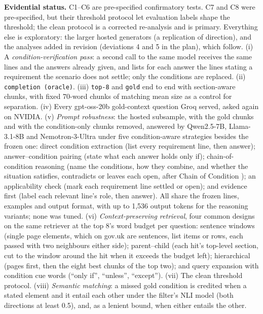 \textbf{Evidential status.} C1--C6 are pre-specified confirmatory tests. C7 and C8 were pre-specified, but their threshold protocol let evaluation labels shape the threshold; the clean protocol is a corrected re-analysis and is primary. Everything else is exploratory: the larger hosted generators (a replication of direction), and the analyses added in revision (deviations 4 and 5 in the plan), which follow. (i) A \emph{condition-verification pass}: a second call to the same model receives the same lines and the answers already given, and lists for each answer the lines stating a requirement the scenario does not settle; only the conditions are replaced. (ii) \texttt{completion (oracle)}. (iii) \texttt{top-8} and \texttt{gold} end to end with section-aware chunks, with fixed 70-word chunks of matching mean size as a control for separation. (iv) Every gpt-oss-20b gold-context question Groq served, asked again on NVIDIA. (v) \emph{Prompt robustness}: the hosted subsample, with the gold chunks and with the condition-only chunks removed, answered by Qwen2.5-7B, Llama-3.1-8B and Nemotron-3-Ultra under five condition-aware strategies besides the frozen one: direct condition extraction (list every requirement line, then answer); answer--condition pairing (state what each answer holds only if); chain-of-condition reasoning (name the conditions, how they combine, and whether the situation satisfies, contradicts or leaves each open, after Chain of Condition \cite{lin2024chaincondition}); an applicability check (mark each requirement line settled or open); and evidence first (label each relevant line's role, then answer). All share the frozen lines, examples and output format, with up to 1{,}536 output tokens for the reasoning variants; none was tuned. (vi) \emph{Context-preserving retrieval}, four common designs on the same retriever at the top 8's word budget per question: sentence windows (single page elements, which on gov.uk are sentences, list items or rows, each passed with two neighbours either side); parent--child (each hit's top-level section, cut to the window around the hit when it exceeds the budget left); hierarchical (pages first, then the eight best chunks of the top two); and query expansion with condition cue words (``only if'', ``unless'', ``except''). (vii) The clean threshold protocol. (viii) \emph{Semantic matching}: a missed gold condition is credited when a stated element and it entail each other under the filter's NLI model (both directions at least 0.5), and, as a lenient bound, when either entails the other.

